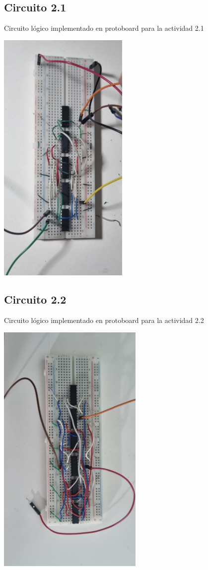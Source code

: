 \subsection{Circuito 2.1}
    Circuito lógico implementado en protoboard para la actividad 2.1
    \begin{center}
    \includegraphics[width=6.3cm]{imagenes/Circuito1.jpg}
    \end{center}

\saltoPag

\subsection{Circuito 2.2}
Circuito lógico implementado en protoboard para la actividad 2.2
    \begin{center}
    \includegraphics[width=7cm]{imagenes/Circuito2.jpg}
    \end{center}
    
